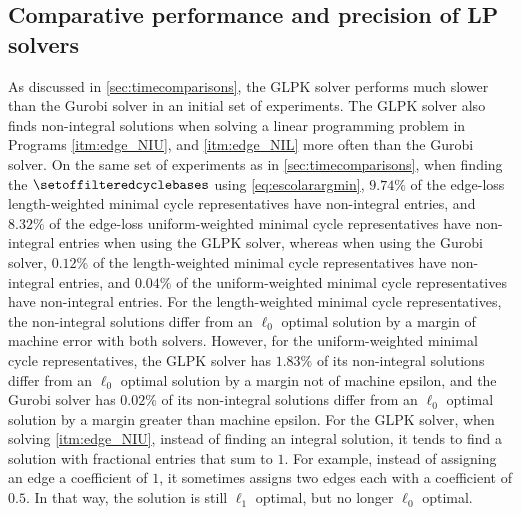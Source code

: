  
\subsection{Comparative performance and precision of LP solvers}\label{Computational cost of the various optimization techniques}

As discussed in \se \ref{sec:timecomparisons}, the GLPK solver performs much slower than the Gurobi solver in an initial set of experiments. The GLPK solver also finds non-integral solutions when solving a linear programming problem in Programs
\ref{itm:edge_NIU}, and
\ref{itm:edge_NIL}
 more often than the Gurobi solver. On the same set of experiments as in \se \ref{sec:timecomparisons}, when finding the $\setoffilteredcyclebases$ using \pr \eqref{eq:escolarargmin}, $9.74\%$ of the edge-loss length-weighted minimal cycle representatives have non-integral entries, and $8.32\%$ of the edge-loss uniform-weighted minimal cycle representatives have non-integral entries when using the GLPK solver, whereas when using the Gurobi solver, $0.12\%$ of the length-weighted minimal cycle representatives have non-integral entries, and $0.04\%$ of the uniform-weighted minimal cycle representatives have non-integral entries. For the length-weighted minimal cycle representatives, the non-integral solutions differ from an $\ell_0$ optimal solution by a margin of machine error with both solvers. However, for the uniform-weighted minimal cycle representatives, the GLPK solver has $1.83\%$ of its non-integral solutions differ from an $\ell_0$ optimal solution by a margin not of machine epsilon, and the Gurobi solver has $0.02\%$ of its non-integral solutions differ from an $\ell_0$ optimal solution by a margin greater than machine epsilon. For the GLPK solver, when solving \pr
 \ref{itm:edge_NIU}, instead of finding an integral solution, it tends to find a solution with fractional entries that sum to $1$. For example, instead of assigning an edge a coefficient of $1$, it sometimes assigns two edges each with a coefficient of $0.5$. In that way, the solution is still $\ell_1$ optimal, but no longer $\ell_0$ optimal.\\

